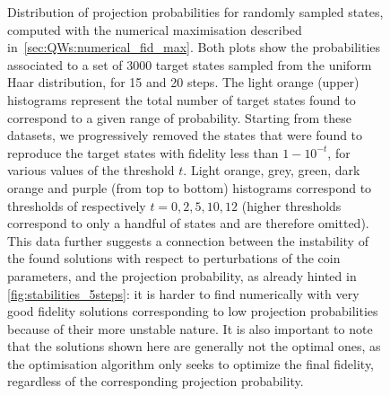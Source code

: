 \begin{figure}[]
    \centering
    \begin{minipage}[b]{0.5\textwidth}
    \end{minipage}%
    \begin{minipage}[b]{0.5\textwidth}
    \end{minipage}
    \caption{
        Distribution of projection probabilities for randomly sampled states, computed with the numerical maximisation described in~\cref{sec:QWs:numerical_fid_max}.
        Both plots show the probabilities associated to a set of 3000 target states sampled from the uniform Haar distribution, for 15 and 20 steps.
        The light orange (upper) histograms represent the total number of target states found to correspond to a given range of probability.
        Starting from these datasets, we progressively removed the states that were found to reproduce the target states with fidelity less than $1 - 10^{-t}$, for various values of the threshold $t$.
        Light orange, grey, green, dark orange and purple (from top to bottom) histograms correspond to thresholds of respectively $t = 0, 2, 5, 10, 12$ (higher thresholds correspond to only a handful of states and are therefore omitted).
        This data further suggests a connection between the instability of the found solutions with respect to perturbations of the coin parameters, and the projection probability, as already hinted in \cref{fig:stabilities_5steps}:
        it is harder to find numerically with very good fidelity solutions corresponding to low projection probabilities because of their more unstable nature.
        It is also important to note that the solutions shown here are generally not the optimal ones,
        as the optimisation algorithm only seeks to optimize the final fidelity,
        regardless of the corresponding projection probability.
    }
    \label{fig:prob_histograms_nmaximize}
\end{figure}


